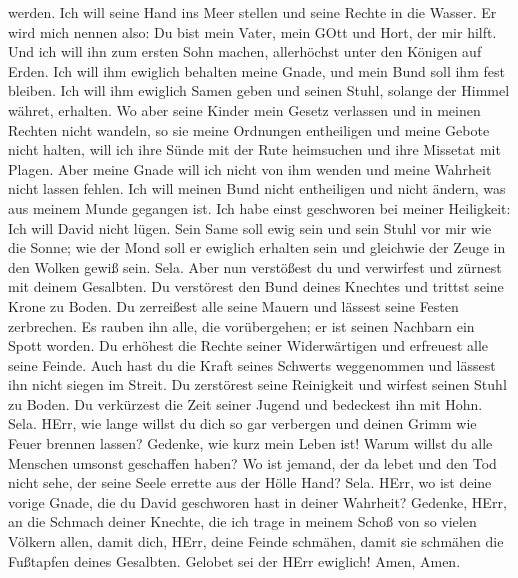 werden.  Ich will seine Hand ins Meer stellen und seine
Rechte in die Wasser.  Er wird mich nennen also: Du bist
mein Vater, mein GOtt und Hort, der mir hilft.  Und ich
will ihn zum ersten Sohn machen, allerhöchst unter den Königen auf
Erden.  Ich will ihm ewiglich behalten meine Gnade, und
mein Bund soll ihm fest bleiben.  Ich will ihm ewiglich
Samen geben und seinen Stuhl, solange der Himmel währet, erhalten.
 Wo aber seine Kinder mein Gesetz verlassen und in meinen
Rechten nicht wandeln,  so sie meine Ordnungen entheiligen
und meine Gebote nicht halten,  will ich ihre Sünde mit der
Rute heimsuchen und ihre Missetat mit Plagen.  Aber meine
Gnade will ich nicht von ihm wenden und meine Wahrheit nicht lassen
fehlen.  Ich will meinen Bund nicht entheiligen und nicht
ändern, was aus meinem Munde gegangen ist.  Ich habe einst
geschworen bei meiner Heiligkeit: Ich will David nicht lügen.
 Sein Same soll ewig sein und sein Stuhl vor mir wie die
Sonne;  wie der Mond soll er ewiglich erhalten sein und
gleichwie der Zeuge in den Wolken gewiß sein. Sela.  Aber
nun verstößest du und verwirfest und zürnest mit deinem Gesalbten.
 Du verstörest den Bund deines Knechtes und trittst seine
Krone zu Boden.  Du zerreißest alle seine Mauern und
lässest seine Festen zerbrechen.  Es rauben ihn alle, die
vorübergehen; er ist seinen Nachbarn ein Spott worden.  Du
erhöhest die Rechte seiner Widerwärtigen und erfreuest alle seine
Feinde.  Auch hast du die Kraft seines Schwerts weggenommen
und lässest ihn nicht siegen im Streit.  Du zerstörest
seine Reinigkeit und wirfest seinen Stuhl zu Boden.  Du
verkürzest die Zeit seiner Jugend und bedeckest ihn mit Hohn. Sela.
 HErr, wie lange willst du dich so gar verbergen und deinen
Grimm wie Feuer brennen lassen?  Gedenke, wie kurz mein
Leben ist! Warum willst du alle Menschen umsonst geschaffen haben?
 Wo ist jemand, der da lebet und den Tod nicht sehe, der
seine Seele errette aus der Hölle Hand? Sela.  HErr, wo ist
deine vorige Gnade, die du David geschworen hast in deiner Wahrheit?
 Gedenke, HErr, an die Schmach deiner Knechte, die ich
trage in meinem Schoß von so vielen Völkern allen,  damit
dich, HErr, deine Feinde schmähen, damit sie schmähen die Fußtapfen
deines Gesalbten.  Gelobet sei der HErr ewiglich! Amen,
Amen.

